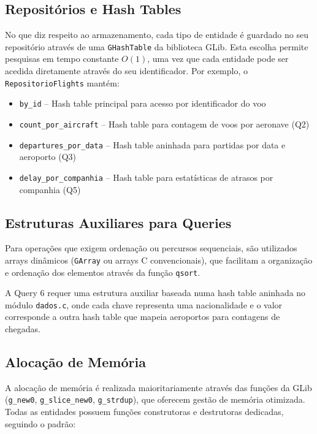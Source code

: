 \documentclass[a4paper,12pt]{scrreprt}
\begin{document}
\subsection{Repositórios e Hash Tables}

No que diz respeito ao armazenamento, cada tipo de entidade é guardado no seu repositório através de uma \texttt{GHashTable} da biblioteca GLib. Esta escolha permite pesquisas em tempo constante $O(1)$, uma vez que cada entidade pode ser acedida diretamente através do seu identificador. Por exemplo, o \texttt{RepositorioFlights} mantém:

\begin{itemize}
    \item \texttt{by\_id} -- Hash table principal para acesso por identificador do voo
    \item \texttt{count\_por\_aircraft} -- Hash table para contagem de voos por aeronave (Q2)
    \item \texttt{departures\_por\_data} -- Hash table aninhada para partidas por data e aeroporto (Q3)
    \item \texttt{delay\_por\_companhia} -- Hash table para estatísticas de atrasos por companhia (Q5)
\end{itemize}

\subsection{Estruturas Auxiliares para Queries}

Para operações que exigem ordenação ou percursos sequenciais, são utilizados arrays dinâmicos (\texttt{GArray} ou arrays C convencionais), que facilitam a organização e ordenação dos elementos através da função \texttt{qsort}.

A Query 6 requer uma estrutura auxiliar baseada numa hash table aninhada no módulo \texttt{dados.c}, onde cada chave representa uma nacionalidade e o valor corresponde a outra hash table que mapeia aeroportos para contagens de chegadas.

\subsection{Alocação de Memória}

A alocação de memória é realizada maioritariamente através das funções da GLib (\texttt{g\_new0}, \texttt{g\_slice\_new0}, \texttt{g\_strdup}), que oferecem gestão de memória otimizada. Todas as entidades possuem funções construtoras e destrutoras dedicadas, seguindo o padrão:
\end{document}
